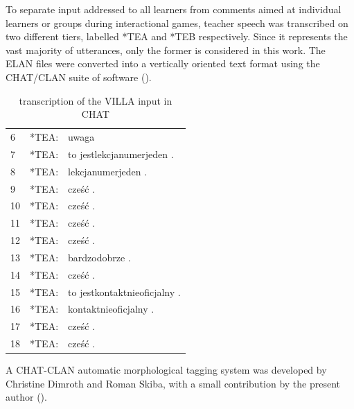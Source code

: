 To separate input addressed to all learners from comments aimed at individual learners or groups during interactional games, teacher speech was transcribed on two different tiers, labelled *TEA and *TEB respectively. Since it represents the vast majority of utterances, only the former is considered in this work. The ELAN files were converted into a vertically oriented text format using the CHAT/CLAN \citep{MacWhinney2000} suite of software ().

\begin{table}
\ttfamily
    \begin{tabular}{lrl}
        6    &   *TEA: & uwaga\\
        7    &   *TEA: & to jestlekcjanumerjeden . \\
        8    &   *TEA: & lekcjanumerjeden .  \\
        9    &   *TEA: & cześć .  \\
        10   &   *TEA: & cześć .  \\
        11   &   *TEA: & cześć .  \\
        12   &   *TEA: & cześć .  \\
        13   &   *TEA: & bardzodobrze .  \\
        14   &   *TEA: & cześć .  \\
        15   &   *TEA: & to jestkontaktnieoficjalny .  \\
        16   &   *TEA: & kontaktnieoficjalny .  \\
        17   &   *TEA: & cześć .  \\
        18   &   *TEA: & cześć . \\
    \end{tabular}
    \caption{transcription of the VILLA input in CHAT}
    \label{tab:02:1}
\end{table}

A CHAT-CLAN automatic morphological tagging system was developed by Christine Dimroth and Roman Skiba, with a small contribution by the present author (). 

